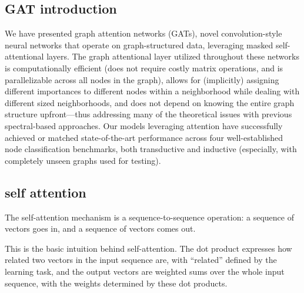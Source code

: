 
\subsection{GAT introduction}

We have presented graph attention networks (GATs), novel convolution-style neural networks that
operate on graph-structured data, leveraging masked self-attentional layers. The graph attentional
layer utilized throughout these networks is computationally efficient (does not require costly matrix operations, 
and is parallelizable across all nodes in the graph), allows for (implicitly) assigning different importances to different 
nodes within a neighborhood while dealing with different
sized neighborhoods, and does not depend on knowing the entire graph structure upfront—thus
addressing many of the theoretical issues with previous spectral-based approaches. Our models
leveraging attention have successfully achieved or matched state-of-the-art performance across four
well-established node classification benchmarks, both transductive and inductive (especially, with
completely unseen graphs used for testing).
\cite{Velickovic2018}




\subsection{self attention}


The self-attention mechanism is a sequence-to-sequence operation: a sequence of vectors goes in, and a sequence of vectors comes out.

This is the basic intuition behind self-attention. The dot product expresses how related two vectors in the 
input sequence are, with “related” defined by the learning task, and the output vectors are weighted sums 
over the whole input sequence, with the weights determined by these dot products.
\cite{zotero-36}
